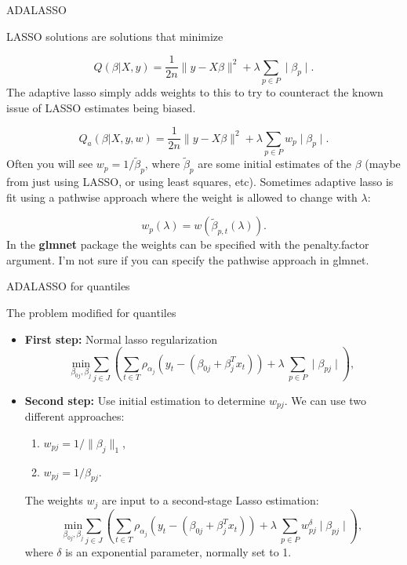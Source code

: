 \documentclass[11pt]{beamer}
\begin{document}
\begin{frame}{ADALASSO}

\small
LASSO solutions are solutions that minimize

\[
Q(\beta|X,y)=\frac{1}{2n}\parallel y-X\beta\parallel^{2}+\lambda\sum_{p \in P}\mid\beta_{p}\mid.
\]
The adaptive lasso simply adds weights to this to try to counteract
the known issue of LASSO estimates being biased. 

\[
Q_{a}(\beta|X,y,w)=\frac{1}{2n}\parallel y-X\beta\parallel^{2}+\lambda\sum_{p \in P}w_{p}\mid\beta_{p}\mid.
\]
Often you will see $w_p=1/\tilde{\beta}_{p}$, where $\tilde{\beta}_{p}$
are some initial estimates of the $\beta$ (maybe from just using
LASSO, or using least squares, etc). Sometimes adaptive lasso is fit
using a pathwise approach where the
weight is allowed to change with $\lambda$:

\[
w_{p}(\lambda)=w(\tilde{\beta}_{p,t}(\lambda)).
\]
In the \textbf{glmnet} package the weights can be specified with the
penalty.factor argument. I'm not sure if you can specify the pathwise
approach in glmnet.

\end{frame}


\begin{frame}{ADALASSO for quantiles}
	

\small
The problem modified for quantiles

\begin{itemize}
	\item \textbf{First step:} Normal lasso regularization
	\[
\underset{\beta_{0j},\beta_j}{\text{min}} \sum_{j \in J} \left( \sum_{t\in T}\rho_{\alpha_j}(y_{t}-(\beta_{0j} + \beta_j^T x_t)) + \lambda\  \sum_{p \in P} \mid  \beta_{pj} \mid \right),
\]
	

	
	\item \textbf{Second step:} Use initial estimation to determine $w_{pj}$. We can use two different approaches:
	\begin{enumerate}
		\item $w_{pj} = 1/ \parallel \beta_j \parallel_1$,
		\item $w_{pj} = 1/ \beta_{pj}$.
	\end{enumerate}
	The weights $w_j$ are input to a second-stage Lasso estimation:
		\[
	\underset{\beta_{0j},\beta_j}{\text{min}} \sum_{j \in J} \left( \sum_{t\in T}\rho_{\alpha_j}(y_{t}-(\beta_{0j} + \beta_j^T x_t)) + \lambda\  \sum_{p \in P} w_{pj}^\delta \mid  \beta_{pj} \mid \right),
	\]
	where $\delta$ is an exponential parameter, normally set to 1.
	
\end{itemize}



\end{frame}
\end{document}
